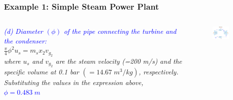\documentclass[10pt,compress,handout,ignorenonframetext]{beamer}
\begin{document}
\begin{frame}
 \frametitle{Example 1: Simple Steam Power Plant}
  \begin{columns}
   \begin{column}[c]{0.5\linewidth}
    {\it  
    \textcolor{blue}{(d) Diameter $\left(\phi\right)$ of the pipe connecting the turbine and the condenser:}\\
$\displaystyle\frac{\pi}{4}\phi^{2}u_{s}=m_{s}x_{2}v_{g_{2}}$\\
where $u_{s}$ and $v_{g_{2}}$ are the steam velocity (=200 m/s) and the specific volume at 0.1 bar $\left(=14.67\;m^{3}/kg\right)$, respectively. Substituting the values in the expression above,\\
\textcolor{blue}{$\phi=0.483\;m$}
}
   \end{column}

   \begin{column}[c]{0.5\linewidth}
    \begin{figure}%
     \begin{center}
      \includegraphics[width=6.25cm,clip]{./Pics/Rankine_Cycle_Exemple01}
     \end{center}
    \end{figure}  
   \end{column}
  \end{columns}

 \normalsize
\end{frame}
\end{document}
